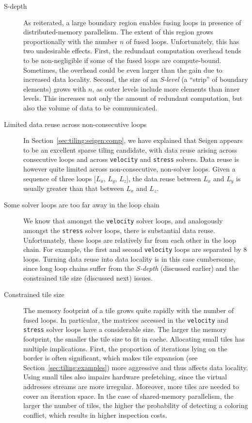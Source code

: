 \begin{description}
\item[S-depth] As reiterated, a large boundary region enables fusing loops in presence of distributed-memory parallelism. The extent of this region grows proportionally with the number $n$ of fused loops. Unfortunately, this has two undesirable effects. First, the redundant computation overhead tends to be non-negligible if some of the fused loops are compute-bound. Sometimes, the overhead could be even larger than the gain due to increased data locality. Second, the size of an {\em S-level} (a ``strip'' of boundary elements) grows with $n$, as outer levels include more elements than inner levels. This increases not only the amount of redundant computation, but also the volume of data to be communicated. 

\item[Limited data reuse across non-consecutive loops] In Section~\ref{sec:tiling:seigen:comp}, we have explained that Seigen appears to be an excellent sparse tiling candidate, with data reuse arising across consecutive loops and across {\tt velocity} and {\tt stress} solvers. Data reuse is however quite limited across non-consecutive, non-solver loops. Given a sequence of three loops $[L_x$, $L_y$, $L_z]$, the data reuse between $L_x$ and $L_y$ is usually greater than that between $L_x$ and $L_z$. 

\item[Some solver loops are too far away in the loop chain] We know that amongst the {\tt velocity} solver loops, and analogously amongst the {\tt stress} solver loops, there is substantial data reuse. Unfortunately, these loops are relatively far from each other in the loop chain. For example, the first and second {\tt velocity} loops are separated by 8 loops. Turning data reuse into data locality is in this case cumbersome, since long loop chains suffer from the {\em S-depth} (discussed earlier) and the constrained tile size (discussed next) issues.

\item[Constrained tile size] The memory footprint of a tile grows quite rapidly with the number of fused loops. In particular, the matrices accessed in the {\tt velocity} and {\tt stress} solver loops have a considerable size. The larger the memory footprint, the smaller the tile size to fit in cache. Allocating small tiles has multiple implications. First, the proportion of iterations lying on the border is often significant, which makes tile expansion (see Section~\ref{sec:tiling:examples}) more aggressive and thus affects data locality. Using small tiles also impairs hardware prefetching, since the virtual addresses streams are more irregular. Moreover, more tiles are needed to cover an iteration space. In the case of shared-memory parallelism, the larger the number of tiles, the higher the probability of detecting a coloring conflict, which results in higher inspection costs.


\end{description}
